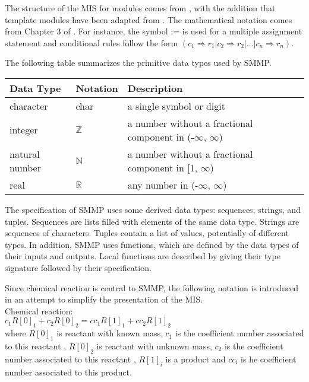 \documentclass[12pt, titlepage]{article}
\begin{document}
The structure of the MIS for modules comes from \cite{HoffmanAndStrooper1995},
with the addition that template modules have been adapted from
\cite{GhezziEtAl2003}.  The mathematical notation comes from Chapter 3 of
\cite{HoffmanAndStrooper1995}.  For instance, the symbol := is used for a
multiple assignment statement and conditional rules follow the form $(c_1
\Rightarrow r_1 | c_2 \Rightarrow r_2 | ... | c_n \Rightarrow r_n )$.

The following table summarizes the primitive data types used by SMMP. 

\begin{center}
\renewcommand{\arraystretch}{1.2}
\noindent 
\begin{tabular}{l l p{7.5cm}} 
\toprule 
\textbf{Data Type} & \textbf{Notation} & \textbf{Description}\\ 
\midrule
character & char & a single symbol or digit\\
integer & $\mathbb{Z}$ & a number without a fractional component in (-$\infty$, $\infty$) \\
natural number & $\mathbb{N}$ & a number without a fractional component in [1, $\infty$) \\
real & $\mathbb{R}$ & any number in (-$\infty$, $\infty$)\\
\bottomrule
\end{tabular} 
\end{center}

\noindent
The specification of SMMP  uses some derived data types: sequences, strings, and
tuples. Sequences are lists filled with elements of the same data type. Strings
are sequences of characters. Tuples contain a list of values, potentially of
different types. In addition, SMMP  uses functions, which
are defined by the data types of their inputs and outputs. Local functions are
described by giving their type signature followed by their specification.

\noindent
Since chemical reaction is central to SMMP, the following notation
is introduced in an attempt to simplify the presentation of the MIS.\\

\noindent
Chemical reaction:\\

$c_1R[0]_1 + c_2R[0]_2 = cc_1R[1]_1 + cc_2R[1]_2$\\

where $R[0]_1$ is reactant with known mass, $c_1$ is the coefficient number associated to this reactant ,
$R[0]_2$  is reactant with unknown mass, $c_2$ is the coefficient number associated to this reactant , 
$R[1]_i$ is a product and  $cc_i$ is he coefficient number associated to this
product.  
\end{document}
